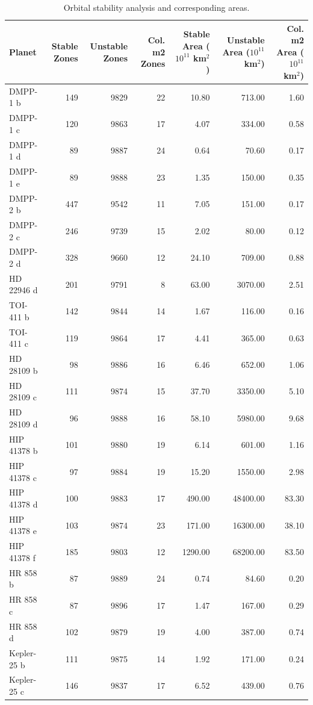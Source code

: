 \begin{table}
\caption{Orbital stability analysis and corresponding areas.}
\label{tab:stability_areas}
\begin{tabular}{lrrrrrr}
\toprule
Planet & Stable Zones & Unstable Zones & Col. m2 Zones & Stable Area ($10^{11}$ km$^2$) & Unstable Area ($10^{11}$ km$^2$) & Col. m2 Area ($10^{11}$ km$^2$) \\
\midrule
DMPP-1 b & 149 & 9829 & 22 & 10.80 & 713.00 & 1.60 \\
DMPP-1 c & 120 & 9863 & 17 & 4.07 & 334.00 & 0.58 \\
DMPP-1 d & 89 & 9887 & 24 & 0.64 & 70.60 & 0.17 \\
DMPP-1 e & 89 & 9888 & 23 & 1.35 & 150.00 & 0.35 \\
DMPP-2 b & 447 & 9542 & 11 & 7.05 & 151.00 & 0.17 \\
DMPP-2 c & 246 & 9739 & 15 & 2.02 & 80.00 & 0.12 \\
DMPP-2 d & 328 & 9660 & 12 & 24.10 & 709.00 & 0.88 \\
HD 22946 d & 201 & 9791 & 8 & 63.00 & 3070.00 & 2.51 \\
TOI-411 b & 142 & 9844 & 14 & 1.67 & 116.00 & 0.16 \\
TOI-411 c & 119 & 9864 & 17 & 4.41 & 365.00 & 0.63 \\
HD 28109 b & 98 & 9886 & 16 & 6.46 & 652.00 & 1.06 \\
HD 28109 c & 111 & 9874 & 15 & 37.70 & 3350.00 & 5.10 \\
HD 28109 d & 96 & 9888 & 16 & 58.10 & 5980.00 & 9.68 \\
HIP 41378 b & 101 & 9880 & 19 & 6.14 & 601.00 & 1.16 \\
HIP 41378 c & 97 & 9884 & 19 & 15.20 & 1550.00 & 2.98 \\
HIP 41378 d & 100 & 9883 & 17 & 490.00 & 48400.00 & 83.30 \\
HIP 41378 e & 103 & 9874 & 23 & 171.00 & 16300.00 & 38.10 \\
HIP 41378 f & 185 & 9803 & 12 & 1290.00 & 68200.00 & 83.50 \\
HR 858 b & 87 & 9889 & 24 & 0.74 & 84.60 & 0.20 \\
HR 858 c & 87 & 9896 & 17 & 1.47 & 167.00 & 0.29 \\
HR 858 d & 102 & 9879 & 19 & 4.00 & 387.00 & 0.74 \\
Kepler-25 b & 111 & 9875 & 14 & 1.92 & 171.00 & 0.24 \\
Kepler-25 c & 146 & 9837 & 17 & 6.52 & 439.00 & 0.76 \\

\end{tabular}
\end{table}
